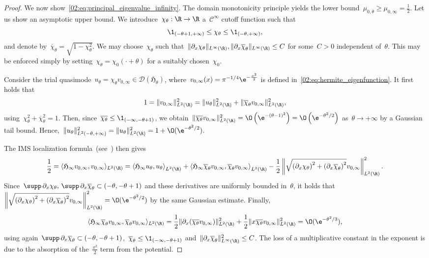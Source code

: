 \begin{proof}
        We now show~\eqref{02:eq:principal_eigenvalue_infinity}. The domain monotonicity principle yields the lower bound~$\mu_{0,\theta}\geq \mu_{0,\infty} = \frac12$.
        Let us show an asymptotic upper bound. We introduce~$\chi_\theta:\R\to\R$ a~$\mathcal C^\infty$ cutoff function such that
        \[\1_{(-\theta+1,+\infty)} \leq \chi_\theta\leq \1_{(-\theta,+\infty)},\]
        and denote by~$\overline{\chi}_\theta = \sqrt{1-\chi_\theta^2}$. We may choose~$\chi_\theta$ such that~$\|\partial_x \chi_\theta\|_{L^\infty(\R)},\|\partial_x\overline{\chi}_\theta\|_{L^\infty(\R)}\leq C$ for some~$C>0$ independent of~$\theta$. This may be enforced simply by setting~$\chi_\theta = \chi_0(\cdot +\theta)$ for a suitably chosen~$\chi_0$.      
        
        Consider the trial quasimode~$u_\theta=\chi_\theta v_{0,\infty}\in \mathcal D(\mathfrak{H}_\theta)$, where~$v_{0,\infty}(x) = \pi^{-1/4}\e^{-\frac{x^2}2}$ is defined in~\eqref{02:eq:hermite_eigenfunction}.
        It first holds that
        \[1 = \|v_{0,\infty}\|^2_{L^2(\R)} = \|u_\theta\|^2_{L^2(\R)} + \|\overline{\chi}_\theta v_{0,\infty}\|^2_{L^2(\R)},\]
        using~$\chi_\theta^2+\overline{\chi}_\theta^2 = 1$. Then, since~$\overline{\chi_\theta}\leq \1_{(-\infty,-\theta+1)}$, we obtain~$\|\overline{\chi_\theta}v_{0,\infty}\|_{L^2(\R)}^2 = \O\left(\e^{-(\theta-1)^2}\right)=\O\left(\e^{-\theta^2/2}\right)$ as~$\theta\to+\infty$ by a Gaussian tail bound. Hence,~$\|u_\theta\|_{L^2(-\theta,+\infty)}^2=\|u_\theta\|^2_{L^2(\R)} = 1 + \O(\e^{-\theta^2/2})$.

        The IMS localization formula~(see~\cite{S83,CFKS87}) then gives
        \[\frac12=\langle \mathfrak{H}_\infty v_{0,\infty},v_{0,\infty}\rangle_{L^2(\R)} = \left\langle \mathfrak{H}_\infty u_\theta,u_\theta \right\rangle_{L^2(\R)} + \left\langle \mathfrak{H}_\infty \overline{\chi}_\theta v_{0,\infty},\overline{\chi}_\theta v_{0,\infty}\right\rangle_{L^2(\R)}-\frac12\left\|\sqrt{\left(\partial_x\chi_\theta\right)^2 + \left(\partial_x\overline\chi_\theta\right)^2} v_{0,\infty}\right\|^2_{L^2(\R)}.\]
        Since~$\supp\, \partial_x\chi_\theta,\,\supp\, \partial_x \overline{\chi}_\theta \subset (-\theta,-\theta+1)$ and these derivatives are uniformly bounded in~$\theta$, it holds that~$\left\|\sqrt{\left(\partial_x\chi_\theta\right)^2 + \left(\partial_x\overline\chi_\theta\right)^2} v_{0,\infty}\right\|^2_{L^2(\R)} = \O(\e^{-\theta^2/2})$ by the same Gaussian estimate.
        Finally,
        \[\langle \mathfrak{H}_\infty \overline{\chi}_\theta v_{0,\infty},\overline{\chi}_\theta v_{0,\infty}\rangle_{L^2(\R)} = \frac12\|\partial_x(\overline{\chi_\theta}v_{0,\infty})\|^2_{L^2(\R)} + \frac12\|x\overline{\chi_\theta}v_{0,\infty}\|^2_{L^2(\R)}=\O(\e^{-\theta^2/3}),\]
        using again~$\supp\,\partial_x\overline{\chi}_\theta\subset (-\theta,-\theta+1)$,~$\overline{\chi}_\theta\leq \1_{(-\infty,-\theta+1)}$ and~$\|\partial_x\overline{\chi}_\theta\|^2_{L^\infty(\R)}\leq C$. The loss of a multiplicative constant in the exponent is due to the absorption of the~$\frac{x^2}2$ term from the potential.


\end{proof}
